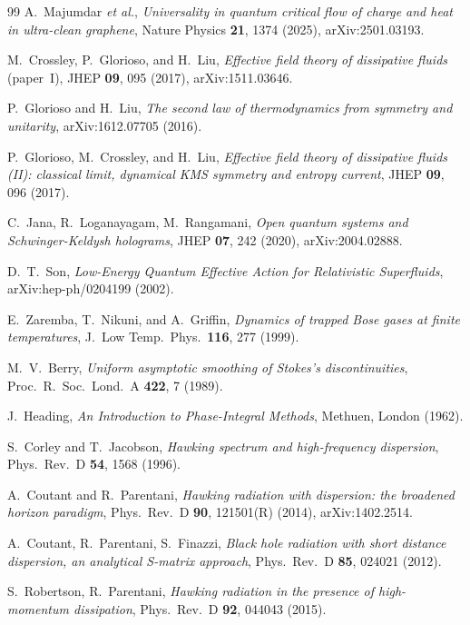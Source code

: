 \documentclass[aps,prd,reprint,nofootinbib,superscriptaddress]{revtex4-2}
\begin{document}
\begin{thebibliography}{99}
A.~Majumdar \emph{et al.},
\emph{Universality in quantum critical flow of charge and heat in
ultra-clean graphene},
Nature Physics \textbf{21}, 1374 (2025), arXiv:2501.03193.

M.~Crossley, P.~Glorioso, and H.~Liu,
\emph{Effective field theory of dissipative fluids} (paper~I),
JHEP \textbf{09}, 095 (2017), arXiv:1511.03646.

P.~Glorioso and H.~Liu,
\emph{The second law of thermodynamics from symmetry and unitarity},
arXiv:1612.07705 (2016).

P.~Glorioso, M.~Crossley, and H.~Liu,
\emph{Effective field theory of dissipative fluids (II):
classical limit, dynamical KMS symmetry and entropy current},
JHEP \textbf{09}, 096 (2017).

C.~Jana, R.~Loganayagam, M.~Rangamani,
\emph{Open quantum systems and Schwinger-Keldysh holograms},
JHEP \textbf{07}, 242 (2020),
arXiv:2004.02888.

D.~T.~Son,
\emph{Low-Energy Quantum Effective Action for Relativistic
Superfluids},
arXiv:hep-ph/0204199 (2002).

E.~Zaremba, T.~Nikuni, and A.~Griffin,
\emph{Dynamics of trapped Bose gases at finite temperatures},
J.~Low Temp.~Phys.~\textbf{116}, 277 (1999).

M.~V.~Berry,
\emph{Uniform asymptotic smoothing of Stokes's discontinuities},
Proc.~R.~Soc.~Lond.~A \textbf{422}, 7 (1989).

J.~Heading,
\emph{An Introduction to Phase-Integral Methods},
Methuen, London (1962).

S.~Corley and T.~Jacobson,
\emph{Hawking spectrum and high-frequency dispersion},
Phys.~Rev.~D \textbf{54}, 1568 (1996).

A.~Coutant and R.~Parentani,
\emph{Hawking radiation with dispersion: the broadened horizon paradigm},
Phys.~Rev.~D \textbf{90}, 121501(R) (2014), arXiv:1402.2514.

A.~Coutant, R.~Parentani, S.~Finazzi,
\emph{Black hole radiation with short distance dispersion, an
analytical S-matrix approach},
Phys.~Rev.~D \textbf{85}, 024021 (2012).

S.~Robertson, R.~Parentani,
\emph{Hawking radiation in the presence of high-momentum
dissipation},
Phys.~Rev.~D \textbf{92}, 044043 (2015).


\end{thebibliography}
\end{document}
